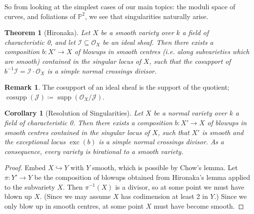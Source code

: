 \documentclass{article}
\newtheorem*{theorem}{Theorem}
\newtheorem*{corollary}{Corollary}
\theoremstyle{definition}
\newtheorem*{remark}{Remark}
\DeclareMathOperator{\exc}{exc}
\DeclareMathOperator{\supp}{supp}
\DeclareMathOperator{\cosupp}{cosupp}
\newcommand{\I}{\mathscr{I}}
\newcommand{\J}{\mathscr{J}}
\renewcommand{\O}{\mathcal{O}}
\renewcommand{\P}{\mathbb{P}}
\begin{document}
So from looking at the simplest cases of our main topics: the moduli space of
curves, and foliations of $\P^2$, we see that singularities naturally arise.

\begin{theorem}[Hironaka]
    Let $X$ be a smooth variety over $k$ a field of characteristic 0, and let
    $\I\subseteq\O_X$ be an ideal sheaf. Then there exists a composition
    $b:X'\to X$ of blowups in smooth centres (i.e. along subvarieties which are
    smooth) contained in the singular locus of $X$, such that the cosupport of
    $b^{-1}\I=\I\cdot\O_X$ is a simple normal crossings divisor.
\end{theorem}

\begin{remark}
    The cosupport of an ideal sheaf is the support of the quotient;
    $\cosupp(\J)\coloneq\supp(\O_X/\J)$.
\end{remark}

\begin{corollary}[Resolution of Singularities]
    Let $X$ be a normal variety over $k$ a field of characteristic 0. Then there
    exists a composition $b:X'\to X$ of blowups in smooth centres contained in
    the singular locus of $X$, such that $X'$ is smooth and the exceptional
    locus $\exc(b)$ is a simple normal crossings divisor. As a consequence,
    every variety is birational to a smooth variety.
\end{corollary}

\begin{proof}
    Embed $X\hookrightarrow Y$ with $Y$ smooth, which is possible by Chow's
    lemma. Let $\pi:Y'\to Y$ be the composition of blowups obtained from
    Hironaka's lemma applied to the subvariety $X$. Then $\pi^{-1}(X)$ is a
    divisor, so at some point we must have blown up $X$. (Since we may assume
    $X$ has codimension at least 2 in $Y$.) Since we only blow up in smooth
    centres, at some point $X$ must have become smooth.
\end{proof}
\end{document}
